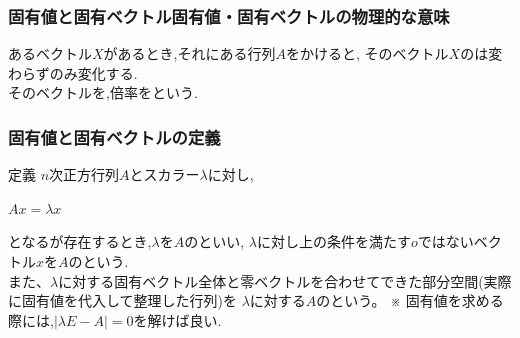 \documentclass[a4paper]{jsarticle}
\begin{document}
\subsubsection{固有値と固有ベクトル固有値・固有ベクトルの物理的な意味}
あるベクトル$X$があるとき,それにある行列$A$をかけると,
そのベクトル$X$のは変わらずのみ変化する.\\
そのベクトルを,倍率をという.
\subsubsection{固有値と固有ベクトルの定義}
\begin{itembox}[l]{定義}
    $n$次正方行列$A$とスカラー$\lambda$に対し,
    \begin{center}
        $Ax=\lambda x$
    \end{center}
    となるが存在するとき,$\lambda$を$A$のといい,
    $\lambda$に対し上の条件を満たす$o$ではないベクトル$x$を$A$のという.\\
    また、$\lambda$に対する固有ベクトル全体と零ベクトルを合わせてできた部分空間(実際に固有値を代入して整理した行列)を
    $\lambda$に対する$A$のという。
    ※ 固有値を求める際には,$|\lambda E-A|=0$を解けば良い.
\end{itembox}
\end{document}
